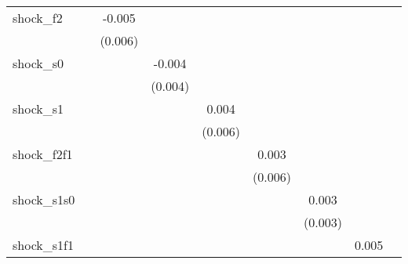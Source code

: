 {\begin{tabular}{l*{8}{c}}
\addlinespace
shock\_f2    &                     &      -0.005         &                     &                     &                     &                     &                     &                     \\
            &                     &     (0.006)         &                     &                     &                     &                     &                     &                     \\
\addlinespace
shock\_s0    &                     &                     &      -0.004         &                     &                     &                     &                     &                     \\
            &                     &                     &     (0.004)         &                     &                     &                     &                     &                     \\
\addlinespace
shock\_s1    &                     &                     &                     &       0.004         &                     &                     &                     &                     \\
            &                     &                     &                     &     (0.006)         &                     &                     &                     &                     \\
\addlinespace
shock\_f2f1  &                     &                     &                     &                     &       0.003         &                     &                     &                     \\
            &                     &                     &                     &                     &     (0.006)         &                     &                     &                     \\
\addlinespace
shock\_s1s0  &                     &                     &                     &                     &                     &       0.003         &                     &                     \\
            &                     &                     &                     &                     &                     &     (0.003)         &                     &                     \\
\addlinespace
shock\_s1f1  &                     &                     &                     &                     &                     &                     &       0.005         &                     \\

\end{tabular}}
